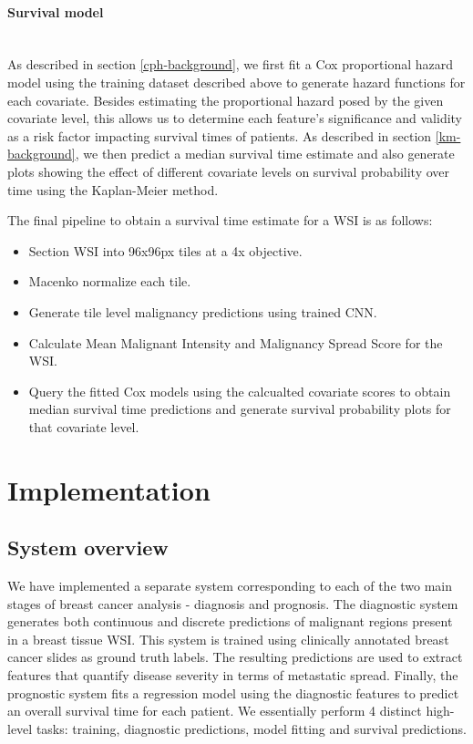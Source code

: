\documentclass{l4proj}
\begin{document}
\subsubsection{Survival model}
\hfill\\
As described in section \ref{cph-background}, we first fit a Cox proportional hazard model using the training dataset described above to generate hazard functions for each covariate. Besides estimating the proportional hazard posed by the given covariate level, this allows us to determine each feature's significance and validity as a risk factor impacting survival times of patients. As described in section \ref{km-background}, we then predict a median survival time estimate and also generate plots showing the effect of different covariate levels on survival probability over time using the Kaplan-Meier method. 

The final pipeline to obtain a survival time estimate for a WSI is as follows:
\begin{itemize}
    \item Section WSI into 96x96px tiles at a 4x objective.
    \item Macenko normalize each tile.
    \item Generate tile level malignancy predictions using trained CNN. 
    \item Calculate Mean Malignant Intensity and Malignancy Spread Score for the WSI. 
    \item Query the fitted Cox models using the calcualted covariate scores to obtain median survival time predictions and generate survival probability plots for that covariate level.  
\end{itemize}

\chapter{Implementation}
\section{System overview}
We have implemented a separate system corresponding to each of the two main stages of breast cancer analysis - diagnosis and prognosis. The diagnostic system generates both continuous and discrete predictions of malignant regions present in a breast tissue WSI. This system is trained using clinically annotated breast cancer slides as ground truth labels. The resulting predictions are used to extract features that quantify disease severity in terms of metastatic spread. Finally, the prognostic system fits a regression model using the diagnostic features to predict an overall survival time for each patient. We essentially perform 4 distinct high-level tasks: training, diagnostic predictions, model fitting and survival predictions. 
\end{document}
